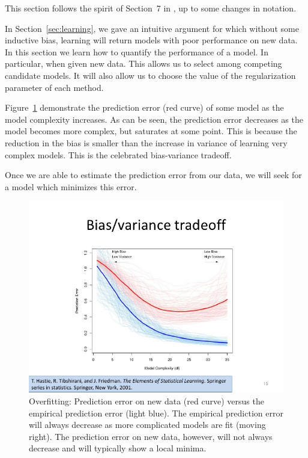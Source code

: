 \documentclass[12pt,a4paper]{article}
\theoremstyle{plain}
\theoremstyle{definition}
\begin{document}
This section follows the spirit of Section~7 in \cite{hastie_elements_2003}, up to some changes in notation.

In Section~\ref{sec:learning}, we gave an intuitive argument for which without some inductive bias, learning will return models with poor performance on new data.
In this section we learn how to quantify the performance of a model. In particular, when given new data. This allows us to select among competing candidate models. It will also allow us to choose the value of the regularization parameter of each method.

Figure~\ref{fig:bias_variance} demonstrate the prediction error (red curve) of some model as the model complexity increases. As can be seen, the prediction error decreases as the model becomes more complex, but saturates at some point. 
This is because the reduction in the bias is smaller than the increase in variance of learning very complex models.
This is the celebrated bias-variance tradeoff.

Once we are able to estimate the prediction error from our data, we will seek for a model which minimizes this error.

\begin{figure}[h]
        \centering
        \includegraphics[width=1\textwidth]{art/support-vector-machine-15-728}
        \caption{Overfitting: 
        Prediction error on new data (red curve) versus the empirical prediction error (light blue).
        The empirical prediction error will always decrease as more complicated models are fit (moving right).
        The prediction error on new data, however, will not always decrease and will typically show a local minima.
        \label{fig:bias_variance}}
\end{figure}
\end{document}
